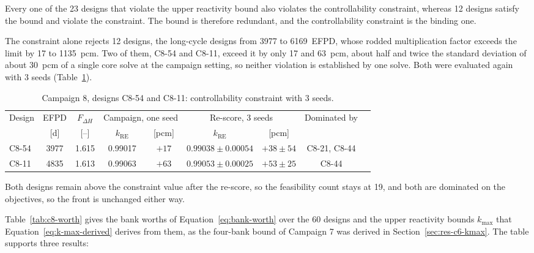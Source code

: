 Every one of the 23 designs that violate the upper reactivity bound
also violates the controllability constraint, whereas 12 designs
satisfy the bound and violate the constraint. The bound is therefore
redundant, and the controllability constraint is the binding one.

The constraint alone rejects 12 designs, the long-cycle designs from
3977 to \SI{6169}{EFPD}, whose rodded multiplication factor exceeds the
limit by 17 to \SI{1135}{pcm}. Two of them, C8-54 and C8-11, exceed it by
only 17 and \SI{63}{pcm}, about half and twice the standard deviation of
about \SI{30}{pcm} of a single core solve at the campaign setting, so
neither violation is established by one solve. Both were evaluated
again with 3 seeds (Table~\ref{tab:c8-rescore}).

\begin{table}[htbp]
  \centering
  \footnotesize
  \caption{Campaign 8, designs C8-54 and C8-11: controllability constraint with 3 seeds.}
  \label{tab:c8-rescore}
  \begin{tabular}{@{}lcccccccl@{}}
    \toprule
    Design & EFPD & $F_{\Delta H}$ & \multicolumn{2}{c}{Campaign, one seed} &
      \multicolumn{2}{c}{Re-score, 3 seeds} & Dominated by \\
    \cmidrule(lr){4-5}\cmidrule(lr){6-7}
     & [d] & [--] & $k_\mathrm{RE}$ & [pcm] & $k_\mathrm{RE}$ & [pcm] & \\
    \midrule
    C8-54 & 3977 & 1.615 & 0.99017 & $+17$ & $0.99038 \pm 0.00054$ & $+38 \pm 54$ & C8-21, C8-44 \\
    C8-11 & 4835 & 1.613 & 0.99063 & $+63$ & $0.99053 \pm 0.00025$ & $+53 \pm 25$ & C8-44 \\
    \bottomrule
  \end{tabular}
\end{table}

Both designs remain above the constraint value after the re-score, so
the feasibility count stays at 19, and both are dominated on the
objectives, so the front is unchanged either way.

Table~\ref{tab:c8-worth} gives the bank worths of
Equation~\eqref{eq:bank-worth} over the 60 designs and the upper
reactivity bounds $k_{\max}$ that Equation~\eqref{eq:k-max-derived}
derives from them, as the four-bank bound of Campaign 7 was derived in
Section~\ref{sec:res-c6-kmax}. The table supports three results:


